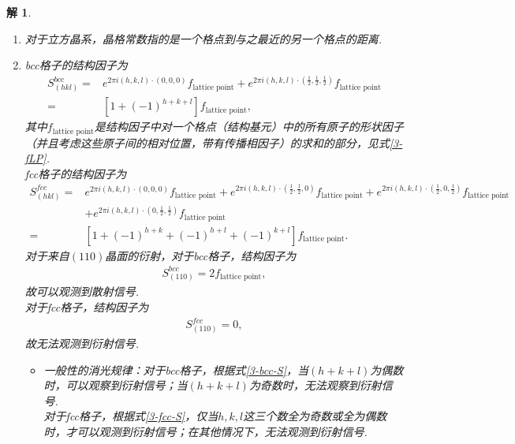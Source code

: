 \documentclass[UTF8,10pt,a4paper]{article}
\theoremstyle{Problem}
\theoremstyle{Solution}
\newtheorem*{sol}{解}
\begin{document}
\begin{sol}
    \begin{enumerate}
        \item[(a)] 对于立方晶系，晶格常数指的是一个格点到与之最近的另一个格点的距离.
        \item[(b)] bcc格子的结构因子为
        \begin{align}
            \label{3-bcc-S}
            \nonumber S_{(hkl)}^{bcc}=&e^{2\pi i(h,k,l)\cdot(0,0,0)}f_{\text{lattice point}}+e^{2\pi i(h,k,l)\cdot(\frac{1}{2},\frac{1}{2},\frac{1}{2})}f_{\text{lattice point}}\\
            =&[1+(-1)^{h+k+l}]f_{\text{lattice point}},
        \end{align}
        其中$f_{\text{lattice point}}$是结构因子中对一个格点（结构基元）中的所有原子的形状因子（并且考虑这些原子间的相对位置，带有传播相因子）的求和的部分，见式\ref{3-fLP}.\\
        fcc格子的结构因子为
        \begin{align}
            \label{3-fcc-S}
            \nonumber S_{(hkl)}^{fcc}=&e^{2\pi i(h,k,l)\cdot(0,0,0)}f_{\text{lattice point}}+e^{2\pi i(h,k,l)\cdot(\frac{1}{2},\frac{1}{2},0)}f_{\text{lattice point}}+e^{2\pi i(h,k,l)\cdot(\frac{1}{2},0,\frac{1}{2})}f_{\text{lattice point}}\\
            \nonumber&+e^{2\pi i(h,k,l)\cdot(0,\frac{1}{2},\frac{1}{2})}f_{\text{lattice point}}\\
            =&[1+(-1)^{h+k}+(-1)^{h+l}+(-1)^{k+l}]f_{\text{lattice point}}.
        \end{align}
        对于来自$(110)$晶面的衍射，对于bcc格子，结构因子为
        \begin{align}
            S_{(110)}^{bcc}=2f_{\text{lattice point}},
        \end{align}
        故可以观测到散射信号.\\
        对于fcc格子，结构因子为
        \begin{align}
            S_{(110)}^{fcc}=0,
        \end{align}
        故无法观测到衍射信号.
        \begin{itemize}
            \item[$\triangleright$] 一般性的消光规律：对于bcc格子，根据式\ref{3-bcc-S}，当$(h+k+l)$为偶数时，可以观察到衍射信号；当$(h+k+l)$为奇数时，无法观察到衍射信号.\\
            对于fcc格子，根据式\ref{3-fcc-S}，仅当$h,k,l$这三个数全为奇数或全为偶数时，才可以观测到衍射信号；在其他情况下，无法观测到衍射信号.

\end{itemize}
\end{enumerate}
\end{sol}
\end{document}
